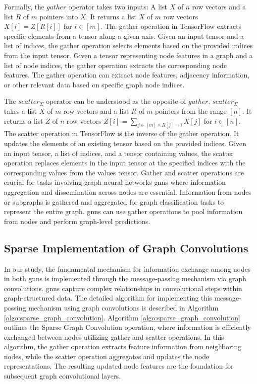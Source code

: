 Formally, the $\mathit{gather}$ operator takes two inputs:
A list $X$ of $n$ row vectors and a list $R$ of $m$ pointers into $X$.
It returns a list $X$ of $m$ row vectors $X[i] = Z[R[i]]$ for $i \in [m]$.
The gather operation in TensorFlow extracts specific elements from a tensor along a given axis.
Given an input tensor and a list of indices, the gather operation selects elements based on the provided indices from the input tensor. Given a tensor representing node features in a graph and a list of node indices, the gather operation extracts the corresponding node features.
The gather operation can extract node features, adjacency information, or other relevant data based on specific graph node indices.

The $\mathit{scatter}_{\Sigma}$ operator can be understood as the opposite of $\mathit{gather}$.
$\mathit{scatter}_{\Sigma}$ takes a list $X$ of $m$ row vectors and a list $R$ of $m$ pointers from the range $[n]$.
It returns a list $Z$ of $n$ row vectors $Z[i] = \sum_{j \in [m] \land R[j] = i} X[j]$ for $i \in [n]$.
The scatter operation in TensorFlow is the inverse of the gather operation.
It updates the elements of an existing tensor based on the provided indices.
Given an input tensor, a list of indices, and a tensor containing values, the scatter operation replaces elements in the input tensor at the specified indices with the corresponding values from the values tensor.
Gather and scatter operations are crucial for tasks involving graph neural networks \acp{gnn} where information aggregation and dissemination across nodes are essential.
Information from nodes or subgraphs is gathered and aggregated for graph classification tasks to represent the entire graph.
\acp{gnn} can use gather operations to pool information from nodes and perform graph-level predictions.

\subsection{Sparse Implementation of Graph Convolutions}
\label{sec:implement:gnndropout:conv}
In our study, the fundamental mechanism for information exchange among nodes in both \acp{gnn} is implemented through the message-passing mechanism via graph convolutions.
\Acp{gnn} capture complex relationships in convolutional steps within graph-structured data.
The detailed algorithm for implementing this message-passing mechanism using graph convolutions is described in Algorithm \ref{algo:sparse_graph_convolution}.
Algorithm \ref{algo:sparse_graph_convolution} outlines the Sparse Graph Convolution operation, where information is efficiently exchanged between nodes utilizing gather and scatter operations.
In this algorithm, the gather operation extracts feature information from neighboring nodes, while the scatter operation aggregates and updates the node representations.
The resulting updated node features are the foundation for subsequent graph convolutional layers.

